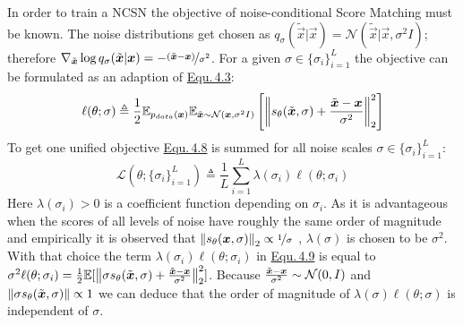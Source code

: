 In order to train a NCSN the objective of noise-conditional Score Matching must be known. The noise distributions get chosen as $q_\sigma(\tilde{\vec{x}}|\vec{x})=\mathcal{N}(\tilde{\vec{x}}|\vec{x},\sigma^2I)$; therefore $\nabla_{\tilde{\vec{x}}}\log q_\sigma(\tilde{\vec{x}}|\vec{x})=-\nicefrac{(\tilde{\vec{x}}-\vec{x})}{\sigma^2}$. For a given $\sigma\in\{\sigma_i\}_{i=1}^L$ the objective can be formulated as an adaption of \hyperref[equ:4.3]{Equ.\,4.3}:
%
\begin{equation} \label{equ:4.8}
    \ell(\theta; \sigma)\triangleq\frac{1}{2}\mathbb{E}_{p_{data}(\vec{x})}\mathbb{E}_{\tilde{\vec{x}}\sim\mathcal{N}(\vec{x},\sigma^2I)}\left[\norm{s_\theta(\tilde{\vec{x}},\sigma)+\frac{\tilde{\vec{x}}-\vec{x}}{\sigma^2}}_2^2\right]
\end{equation}
% 
To get one unified objective \hyperref[equ:4.8]{Equ.\,4.8} is summed for all noise scales $\sigma\in\{\sigma_i\}_{i=1}^L$:
%
\begin{equation} \label{equ:4.9}
    \mathcal{L}(\theta;\{\sigma_i\}_{i=1}^L)\triangleq\frac{1}{L}\sum_{i=1}^L\lambda(\sigma_i)\ell(\theta;\sigma_i)
\end{equation}
%
Here $\lambda(\sigma_i)>0$ is a coefficient function depending on $\sigma_i$. As it is advantageous when the scores of all levels of noise have roughly the same order of magnitude and empirically it is observed that $\norm{s_\theta(\vec{x},\sigma)}_2\propto\nicefrac{1}{\sigma}$ \cite{score_2}, $\lambda(\sigma)$ is chosen to be $\sigma^2$. With that choice the term $\lambda(\sigma_i)\ell(\theta;\sigma_i)$ in \hyperref[equ:4.9]{Equ.\,4.9} is equal to $\sigma^2\ell(\theta;\sigma_i)=\frac{1}{2}\mathbb{E}[\norm{\sigma s_\theta(\tilde{\vec{x}},\sigma)+\frac{\tilde{\vec{x}}-\vec{x}}{\sigma^2}}_2^2]$. Because $\frac{\tilde{\vec{x}}-\vec{x}}{\sigma^2}\sim\nolinebreak\mathcal{N}(0, I)$ and $\norm{\sigma s_\theta(\tilde{\vec{x}},\sigma)}\propto1$ we can deduce that the order of magnitude of $\lambda(\sigma)\ell(\theta;\sigma)$ is independent of $\sigma$.
%
